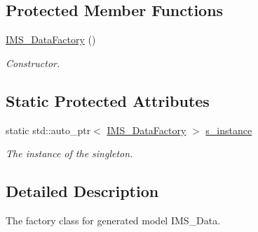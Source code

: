 \subsection*{Protected Member Functions}
\begin{DoxyCompactItemize}
\item 
\hypertarget{classIMS__Data_1_1IMS__DataFactory_a53f18466701c7ff0ba72f6d15c762530}{
\hyperlink{classIMS__Data_1_1IMS__DataFactory_a53f18466701c7ff0ba72f6d15c762530}{IMS\_\-DataFactory} ()}
\label{classIMS__Data_1_1IMS__DataFactory_a53f18466701c7ff0ba72f6d15c762530}

\begin{DoxyCompactList}\small\item\em Constructor. \item\end{DoxyCompactList}\end{DoxyCompactItemize}
\subsection*{Static Protected Attributes}
\begin{DoxyCompactItemize}
\item 
\hypertarget{classIMS__Data_1_1IMS__DataFactory_a769ab1ce887a039002f18cf5ce4b3e1e}{
static std::auto\_\-ptr$<$ \hyperlink{classIMS__Data_1_1IMS__DataFactory}{IMS\_\-DataFactory} $>$ \hyperlink{classIMS__Data_1_1IMS__DataFactory_a769ab1ce887a039002f18cf5ce4b3e1e}{s\_\-instance}}
\label{classIMS__Data_1_1IMS__DataFactory_a769ab1ce887a039002f18cf5ce4b3e1e}

\begin{DoxyCompactList}\small\item\em The instance of the singleton. \item\end{DoxyCompactList}\end{DoxyCompactItemize}


\subsection{Detailed Description}
The factory class for generated model IMS\_\-Data. 


